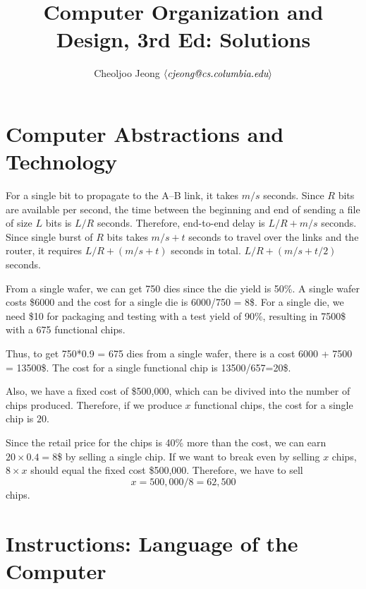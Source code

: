 \documentclass{myart}
\begin{document}
\title{\large\bf Computer Organization and Design, 3rd Ed: Solutions
  \vspace*{-0.5cm}} 
\author{\normalsize Cheoljoo Jeong $\mbox{$\langle{\textit{\mbox{cjeong@cs.columbia.edu}}}\rangle$}$}
\date{}
\maketitle
\small

\section{Computer Abstractions and Technology}
\bit
\w {}
  \bit
  \w [a.] For a single bit to propagate to the A--B link, it takes $m/s$
  seconds. Since $R$ bits are available per second, the time between the
  beginning and end of sending a file of size $L$ bits is 
   $L/R$ seconds. 
   Therefore, end-to-end delay is $L/R + m/s$ seconds.
  \w [b.] Since single burst of $R$ bits takes $m/s + t$ seconds to travel
  over the links and the router, it requires $L/R + (m/s + t)$ seconds in
  total. 
  \w [c.] $L/R + (m/s + t/2)$ seconds.
  \eit
  
\w {}
   From a single wafer, we can get 750 dies since the die yield is 50\%.
   A single wafer costs \$6000 and the cost for a single die is
   6000/750 = 8\$.
   For a single die, we need \$10 for packaging and testing with a test yield
   of 90\%, resulting in 7500\$ with a 675 functional chips.

   Thus, to get 750*0.9 = 675 dies from a single wafer, there is a cost
   6000 + 7500 = 13500\$.
   The cost for a single functional chip is 13500/657=20\$.

   Also, we have a fixed cost of \$500,000, which can be divived into the
   number of chips produced. 
   Therefore, if we produce $x$ functional chips, the cost for a single chip
   is $20$.

   Since the retail price for the chips is 40\% more than the cost, we can 
   earn $20\times 0.4 = 8$\$ by selling a single chip.
   If we want to break even by selling $x$ chips, $8\times x$ should equal
   the fixed cost \$500,000. 
   Therefore, we have to sell
      \[ x = 500,000/8 = 62,500\]
   chips.
\eit


\section{Instructions: Language of the Computer}
\bit
\w 

\eit
\end{document}
